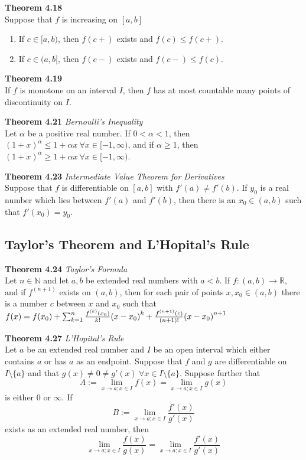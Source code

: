 \documentclass[8pt,landscape]{article}
\begin{document}
\begin{multicols}{3}
    \textbf{Theorem 4.18} \\
    Suppose that $f$ is increasing on $[a, b]$
    \begin{enumerate}
        \item If $c \in [a, b)$, then $f(c+)$ exists and $f(c) \leq f(c+)$.
        \item If $c \in (a, b]$, then $f(c-)$ exists and $f(c-) \leq f(c)$.
    \end{enumerate}

    \textbf{Theorem 4.19} \\
    If $f$ is monotone on an interval $I$, then $f$ has at most countable many points
    of discontinuity on $I$.

    \textbf{Theorem 4.21} \emph{Bernoulli's Inequality} \\
    Let $\alpha$ be a positive real number.
    If $0 < \alpha < 1$, then
    ${(1+x)}^\alpha \leq 1 + \alpha x \ \forall x \in [-1, \infty)$,
    and if $\alpha \geq 1$, then
    ${(1+x)}^\alpha \geq 1 + \alpha x \ \forall x \in [-1, \infty)$.

    \textbf{Theorem 4.23} \emph{Intermediate Value Theorem for Derivatives} \\
    Suppose that $f$ is differentiable on $[a, b]$ with $f'(a) \neq f'(b)$.
    If $y_0$ is a real number which lies between $f'(a)$ and $f'(b)$,
    then there is an $x_0 \in (a, b)$ such that $f'(x_0) = y_0$.

    \subsection{Taylor's Theorem and L'Hopital's Rule}

    \textbf{Theorem 4.24} \emph{Taylor's Formula} \\
    Let $n \in \mathbb{N}$ and let $a, b$ be extended real numbers with $a<b$.
    If $f : (a, b) \to \mathbb{R}$, and if $f^{(n+1)}$ exists on $(a, b)$,
    then for each pair of points $x, x_0 \in (a, b)$ there is a number $c$
    between $x$ and $x_0$ such that \\
    $f(x) = f(x_0) + \sum_{k=1}^n \frac{f^{(k)} (x_0)}{k!}{(x-x_0)}^k + \\
    \frac{f^{(n+1)}(c)}{(n+1)!} {(x-x_0)}^{n+1}$

    \textbf{Theorem 4.27} \emph{L'Hopital's Rule} \\
    Let $a$ be an extended real number and $I$ be an open interval which either contains
    $a$ or has $a$ as an endpoint.
    Suppose that $f$ and $g$ are differentiable on $I \setminus \{a\}$ and that
    $g(x) \neq 0 \neq g'(x) \ \forall x \in I \setminus \{a\}$.
    Suppose further that
    \[
        A := \lim_{x \to a; x \in I} f(x) = \lim_{x \to a; x \in I} g(x)
    \]
    is either $0$ or $\infty$.
    If
    \[
        B := \lim_{x \to a; x \in I} \frac{f'(x)}{g'(x)}
    \]
    exists as an extended real number, then
    \[
        \lim_{x \to a; x \in I} \frac{f(x)}{g(x)} =
        \lim_{x \to a; x \in I} \frac{f'(x)}{g'(x)}
    \]


\end{multicols}
\end{document}
